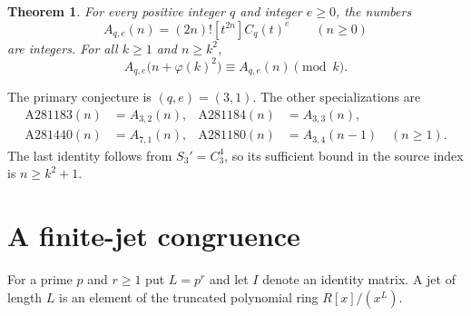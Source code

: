 \documentclass[11pt]{article}
\newtheorem{theorem}{Theorem}
\begin{document}
\begin{samepage}
\begin{theorem}\label{main}
For every positive integer $q$ and integer $e\geq0$, the numbers
\[
 A_{q,e}(n)=(2n)![t^{2n}]C_q(t)^e\qquad(n\geq0)
\]
are integers. For all $k\geq1$ and $n\geq k^2$,
\begin{equation}\label{period}
 A_{q,e}\bigl(n+\varphi(k)^2\bigr)\equiv A_{q,e}(n)\pmod{k}.
\end{equation}
\end{theorem}
\end{samepage}

The primary conjecture is $(q,e)=(3,1)$. The other specializations
\cite{oeis180,oeis183,oeis184,oeis440} are
\begin{equation}\label{identifications}
\begin{aligned}
 \mathrm{A281183}(n)&=A_{3,2}(n),&
 \mathrm{A281184}(n)&=A_{3,3}(n),\\
 \mathrm{A281440}(n)&=A_{7,1}(n),&
 \mathrm{A281180}(n)&=A_{3,4}(n-1)\quad(n\geq1).
\end{aligned}
\end{equation}
The last identity follows from $S_3'=C_3^4$, so its sufficient bound in
the source index is $n\geq k^2+1$.

\section{A finite-jet congruence}
For a prime $p$ and $r\geq1$ put $L=p^r$ and let $I$ denote an identity
matrix. A jet of length $L$ is an element of the truncated polynomial
ring $R[x]/(x^L)$.
\end{document}
